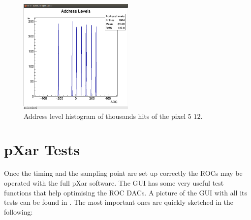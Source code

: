 \documentclass[british,11pt,a4paper]{memoir}
\begin{document}
\begin{figure}[ht]
	\centering
	\includegraphics[width=0.5\textwidth]{address_lvls}
	\caption{Address level histogram of thousands hits of the pixel $5$ $12$.}
	\label{padrlev}
\end{figure}\no
\section{pXar Tests}
Once the timing and the sampling point are set up correctly the \ac{ROC}s may be operated with the full pXar software. The \ac{GUI} has some very useful test functions that help optimising the \ac{ROC} \ac{DAC}s. A picture of the \ac{GUI} with all its tests can be found in . The most important ones are quickly sketched in the following:
\end{document}
